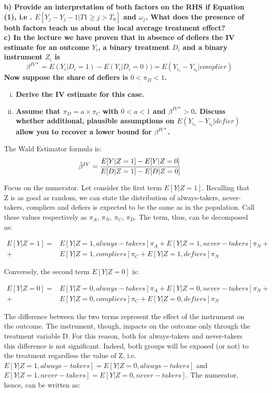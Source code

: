 \documentclass[a4paper,12pt,oneside,English]{article}
\begin{document}
\textbf{b) Provide an interpretation of both factors on the RHS if Equation (1), i.e . $E [Y_j − Y_j−1 | T1 \geq j > T_0]$
and $\omega_j$. What does the presence of both factors teach us about the local average treatment effect?\\

c) In the lecture we have proven that in absence of defiers the IV estimate for an outcome $Y_i$, a binary treatment $D_i$ and a binary instrument $Z_i$ is
\begin{equation}
    \beta^{IV*} = E(Y_i|D_i = 1) - E(Y_i|D_i = 0)) = E(Y_i_1 - Y_i_0|complier)
\end{equation}
Now suppose the share of defiers is $0 < \pi_D < 1$.}
\begin{enumerate}[i)]
    \item \textbf{Derive the IV estimate for this case.}
    \item \textbf{Assume that $\pi_D = a × \pi_C$ with $0 < a < 1$ and $\beta^{IV*}> 0$. Discuss whether additional, plausible assumptions on $E(Y_i_1 - Y_i_0|defier)$ allow you to recover a lower bound for $\beta^{IV*}$.}
\end{enumerate}

The Wald Estimator formula is:
\[
\hat\beta^{IV}=\cfrac{E[Y|Z=1]-E[Y|Z=0]}{E[D|Z=1]-E[D|Z=0]}
\]

Focus on the numerator. Let consider the first term $E[Y|Z=1]$. Recalling that Z is as good as random, we can state the distribution of always-takers, never-takers, compliers and defiers is expected to be the same as in the population. Call these values respectively as $\pi_A,\,\pi_N,\,\pi_C,\,\pi_D$. The term, thus, can be decomposed as:

\[
\begin{split}
    E[Y|Z=1]=&E[Y|Z=1, always-takers]\pi_A+E[Y|Z=1, never-takers]\pi_N+\\
    +&E[Y|Z=1, compliers]\pi_C+E[Y|Z=1, defiers]\pi_N
\end{split}
\]

Conversely, the second term $E[Y|Z=0]$ is:

\[
\begin{split}
    E[Y|Z=0]=&E[Y|Z=0, always-takers]\pi_A+E[Y|Z=0, never-takers]\pi_N+\\
    +&E[Y|Z=0, compliers]\pi_C+E[Y|Z=0, defiers]\pi_N
\end{split}
\]

The difference between the two terms represent the effect of the instrument on the outcome. The instrument, though, impacts on the outcome only through the treatment variable D. For this reason, both for always-takers and never-takers this difference is not significant. Indeed, both groups will be exposed (or not) to the treatment regardless the value of Z, i.e. $E[Y|Z=1,always-takers]=E[Y|Z=0,always-takers]$ and $E[Y|Z=1,never-takers]=E[Y|Z=0,never-takers]$. The numerator, hence, can be written as:
\end{document}
